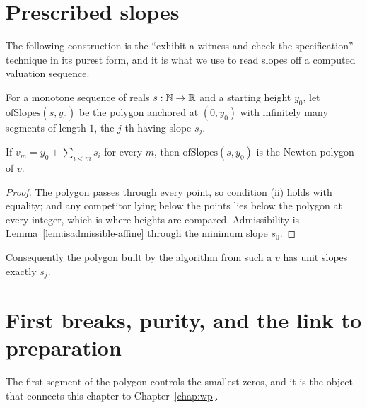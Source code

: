 \section{Prescribed slopes}

The following construction is the ``exhibit a witness and check the specification'' technique in
its purest form, and it is what we use to read slopes off a computed valuation sequence.

\begin{definition}
  \label{def:ofslopes}
  \leanok
  For a monotone sequence of reals $s : \mathbb{N} \to \mathbb{R}$ and a starting height $y_0$, let
  $\mathrm{ofSlopes}(s, y_0)$ be the polygon anchored at $(0, y_0)$ with infinitely many segments
  of length $1$, the $j$-th having slope $s_j$.
\end{definition}

\begin{theorem}
  \label{thm:ofslopes}
  \leanok
  If $v_m = y_0 + \sum_{i < m} s_i$ for every $m$, then $\mathrm{ofSlopes}(s, y_0)$ is the Newton
  polygon of $v$.
\end{theorem}

\begin{proof}
  \leanok
  The polygon passes through every point, so condition (ii) holds with equality; and any
  competitor lying below the points lies below the polygon at every integer, which is where
  heights are compared.  Admissibility is Lemma~\ref{lem:isadmissible-affine} through the minimum
  slope $s_0$.
\end{proof}

\begin{corollary}
  \label{cor:ofslopes-transport}
  \leanok
  Consequently the polygon built by the algorithm from such a $v$ has unit slopes exactly $s_j$.
\end{corollary}

\section{First breaks, purity, and the link to preparation}

The first segment of the polygon controls the smallest zeros, and it is the object that connects
this chapter to Chapter~\ref{chap:wp}.

